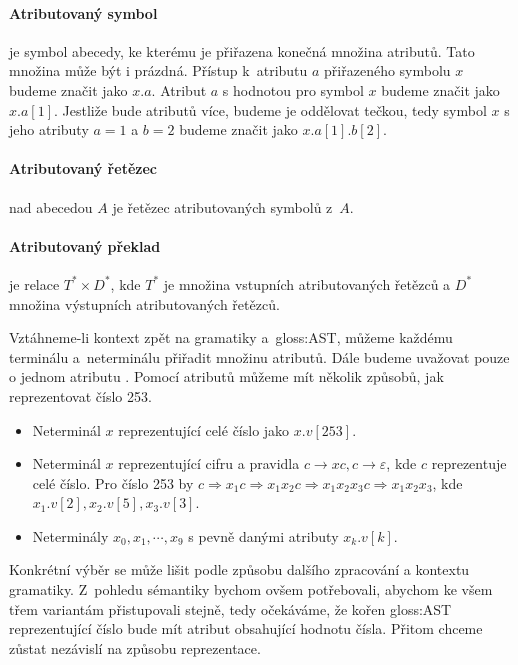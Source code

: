 		\paragraph{Atributovaný symbol}
		je symbol abecedy, ke kterému je přiřazena konečná množina atributů. Tato množina může být i prázdná. Přístup k~atributu $a$ přiřazeného symbolu $x$ budeme značit jako $x.a$. Atribut $a$ s hodnotou  pro symbol $x$ budeme značit jako $x.a[1]$. Jestliže bude atributů více, budeme je oddělovat tečkou, tedy symbol $x$ s jeho atributy $a=1$ a $b=2$ budeme značit jako $x.a[1].b[2]$.
		\paragraph{Atributovaný řetězec}
		nad abecedou $A$ je řetězec atributovaných symbolů z~$A$.
		\paragraph{Atributovaný překlad}
		je relace ${T}^{\ast} \times {D}^{\ast}$, kde ${T}^{\ast}$ je množina vstupních atributovaných řetězců a ${D}^{\ast}$ množina výstupních atributovaných řetězců.
		
		\vspace{1em}
		
		Vztáhneme-li kontext zpět na gramatiky a~\gls{gloss:AST}, můžeme každému terminálu a~neterminálu přiřadit množinu atributů. Dále budeme uvažovat pouze o jednom atributu . Pomocí atributů můžeme mít několik způsobů, jak reprezentovat číslo 253.
		\begin{itemize}
			\item Neterminál $x$ reprezentující celé číslo jako $x.v[253]$.
			\item Neterminál $x$ reprezentující cifru a pravidla $c \rightarrow x c, c\rightarrow\varepsilon$, kde $c$ reprezentuje celé číslo. Pro číslo 253 by 
			$c\Rightarrow x_1c \Rightarrow x_1x_2c\Rightarrow x_1x_2x_3c\Rightarrow x_1x_2x_3$, kde $x_1.v[2], x_2.v[5], x_3.v[3]$.
			\item Neterminály $x_0,x_1,\cdots,x_9$ s pevně danými atributy $x_k.v[k]$.
		\end{itemize}
	
		Konkrétní výběr se může lišit podle způsobu dalšího zpracování a kontextu gramatiky. Z~pohledu sémantiky bychom ovšem potřebovali, abychom ke všem třem variantám přistupovali stejně, tedy očekáváme, že kořen \gls{gloss:AST} reprezentující číslo bude mít atribut obsahující hodnotu čísla. Přitom chceme zůstat nezávislí na způsobu reprezentace.
		
